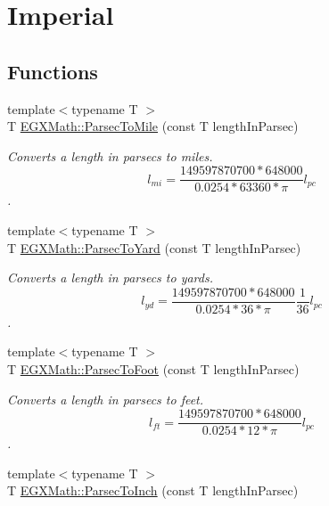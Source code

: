 \hypertarget{group___e_g_x_math-_conversions-_length_conversions-_astronomical-_parsec-_imperial}{}\section{Imperial}
\label{group___e_g_x_math-_conversions-_length_conversions-_astronomical-_parsec-_imperial}
\subsection*{Functions}
\begin{DoxyCompactItemize}
\item 
{\footnotesize template$<$typename T $>$ }\\T \mbox{\hyperlink{group___e_g_x_math-_conversions-_length_conversions-_astronomical-_parsec-_imperial_gaff2c298a0830dd20dc3acce2d9d789f8}{E\+G\+X\+Math\+::\+Parsec\+To\+Mile}} (const T length\+In\+Parsec)
\begin{DoxyCompactList}\small\item\em Converts a length in parsecs to miles. \[ l_{mi}=\frac{149597870700 * 648000}{ 0.0254 * 63360 * \pi} l_{pc} \]. \end{DoxyCompactList}\item 
{\footnotesize template$<$typename T $>$ }\\T \mbox{\hyperlink{group___e_g_x_math-_conversions-_length_conversions-_astronomical-_parsec-_imperial_gae9ae73b70979fb012736516147854cf4}{E\+G\+X\+Math\+::\+Parsec\+To\+Yard}} (const T length\+In\+Parsec)
\begin{DoxyCompactList}\small\item\em Converts a length in parsecs to yards. \[ l_{yd}= \frac{149597870700 * 648000}{0.0254 * 36 * \pi} \frac{1}{36} l_{pc} \]. \end{DoxyCompactList}\item 
{\footnotesize template$<$typename T $>$ }\\T \mbox{\hyperlink{group___e_g_x_math-_conversions-_length_conversions-_astronomical-_parsec-_imperial_ga2c9e8ada868b6915660db313612ac550}{E\+G\+X\+Math\+::\+Parsec\+To\+Foot}} (const T length\+In\+Parsec)
\begin{DoxyCompactList}\small\item\em Converts a length in parsecs to feet. \[ l_{ft}= \frac{149597870700 * 648000}{0.0254 * 12 * \pi} l_{pc} \]. \end{DoxyCompactList}\item 
{\footnotesize template$<$typename T $>$ }\\T \mbox{\hyperlink{group___e_g_x_math-_conversions-_length_conversions-_astronomical-_parsec-_imperial_gaebc7c4ce22fe7ae0ae26420284598c29}{E\+G\+X\+Math\+::\+Parsec\+To\+Inch}} (const T length\+In\+Parsec)

\end{DoxyCompactItemize}
